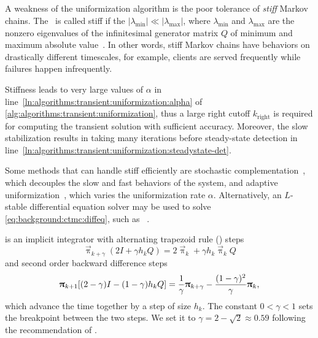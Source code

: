 \subsection{}
\label{ssec:algorithms:trbdf2}

A weakness of the uniformization algorithm is the poor tolerance of
\emph{stiff} Markov chains. The \CTMC\ is called stiff if the
$\lvert \lambda_{\min} \rvert \ll \lvert \lambda_{\max} \rvert$, where
$\lambda_{\min}$ and $\lambda_{\max}$ are the nonzero eigenvalues of
the infinitesimal generator matrix $Q$ of minimum and maximum absolute
value~\citep{DBLP:journals/cor/ReibmanT88}. In other words, stiff
Markov chains have behaviors on drastically different timescales, for
example, clients are served frequently while failures happen
infrequently.

Stiffness leads to very large values of $\alpha$ in
line~\ref{ln:algorithms:transient:uniformization:alpha} of
\vref{alg:algorithms:transient:uniformization}, thus a large right
cutoff $k_{\text{right}}$ is required for computing the transient
solution with sufficient accuracy. Moreover, the slow stabilization
results in taking many iterations before steady-state detection in
line~\ref{ln:algorithms:transient:uniformization:steadystate-det}.

Some methods that can handle stiff  efficiently are
stochastic complementation~\citep{meyer1989stochastic}, which
decouples the slow and fast behaviors of the system, and adaptive
uniformization~\citep{van1994adaptive}, which varies the uniformization
rate $\alpha$. Alternatively, an $L$-stable differential equation
solver may be used to solve \vref{eq:background:ctmc:diffeq}, such as
\mbox{}~\citep{DBLP:journals/cor/ReibmanT88,%
DBLP:journals/tcad/BankCFGRS85}.

 is an implicit integrator with alternating trapezoid
rule () steps
\begin{equation}
  \vec{\uppi}_{k + \gamma} (2I + \gamma h_k Q) = 2 \vec{\uppi}_{k} +
  \gamma h_k \vec{\uppi}_k Q
\end{equation}
and second order backward difference steps
\begin{equation}
  \vec{\uppi}_{k + 1} [(2 - \gamma) I - (1 - \gamma) h_k Q] =
  \frac{1}{\gamma} \vec{\uppi}_{k + \gamma} - \frac{(1 -
    \gamma)^2}{\gamma} \vec{\uppi}_k \text,
\end{equation}
which advance the time together by a step of size $h_k$. The constant
$0 < \gamma < 1$ sets the breakpoint between the two steps. We set it
to $\gamma = 2 - \sqrt{2} \approx 0.59$ following the recommendation
of \citet{DBLP:journals/tcad/BankCFGRS85}.

